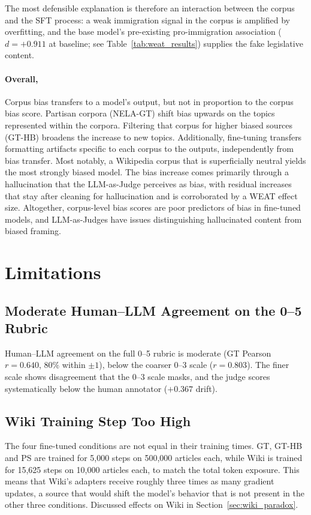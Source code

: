 \documentclass[12pt]{article}
\begin{document}
The most defensible explanation is therefore an interaction between the corpus and the SFT process: a weak immigration signal in the corpus is amplified by overfitting, and the base model's pre-existing pro-immigration association ($d = +0.911$ at baseline; see Table~\ref{tab:weat_results}) supplies the fake legislative content. 

\paragraph{Overall,}Corpus bias transfers to a model's output, but not in proportion to the corpus bias score. 
Partisan corpora (NELA-GT) shift bias upwards on the topics represented within the corpora.
Filtering that corpus for higher biased sources (GT-HB) broadens the increase to new topics.
Additionally, fine-tuning transfers formatting artifacts specific to each corpus to the outputs, independently from bias transfer.
Most notably, a Wikipedia corpus that is superficially neutral yields the most strongly biased model.
The bias increase comes primarily through a hallucination that the LLM-as-Judge perceives as bias, with residual increases that stay after cleaning for hallucination and is corroborated by a WEAT effect size.
Altogether, corpus-level bias scores are poor predictors of bias in fine-tuned models, and LLM-as-Judges have issues distinguishing hallucinated content from biased framing.

\section{Limitations}

\subsection{Moderate Human--LLM Agreement on the 0--5 Rubric}
Human--LLM agreement on the full 0--5 rubric is moderate (GT Pearson $r = 0.640$, $80\%$ within $\pm1$), below the coarser 0--3 scale ($r = 0.803$).
The finer scale shows disagreement that the 0--3 scale masks, and the judge scores systematically below the human annotator ($+0.367$ drift). 

\subsection{Wiki Training Step Too High}
The four fine-tuned conditions are not equal in their training times.
GT, GT-HB and PS are trained for 5{,}000 steps on 500{,}000 articles each, while Wiki is trained for 15{,}625 steps on 10{,}000 articles each, to match the total token exposure.
This means that Wiki's adapters receive roughly three times as many gradient updates, a source that would shift the model's behavior that is not present in the other three conditions.
Discussed effects on Wiki in Section~\ref{sec:wiki_paradox}.
\end{document}

